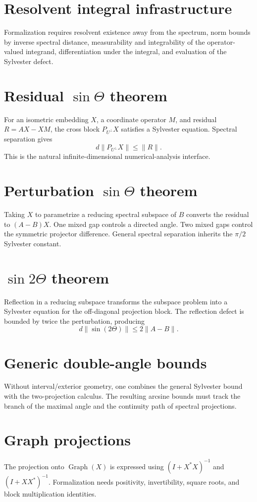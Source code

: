 \documentclass{article}
\newcommand{\Graph}{\operatorname{Graph}}
\begin{document}
\section{Resolvent integral infrastructure}
Formalization requires resolvent existence away from the spectrum, norm
bounds by inverse spectral distance, measurability and integrability of the
operator-valued integrand, differentiation under the integral, and evaluation
of the Sylvester defect.

\section{Residual $\sin\Theta$ theorem}
For an isometric embedding $X$, a coordinate operator $M$, and residual
$R=AX-XM$, the cross block $P_{U^\perp}X$ satisfies a Sylvester equation.
Spectral separation gives
\[
 d\|P_{U^\perp}X\|\le\|R\|.
\]
This is the natural infinite-dimensional numerical-analysis interface.

\section{Perturbation $\sin\Theta$ theorem}
Taking $X$ to parametrize a reducing spectral subspace of $B$ converts the
residual to $(A-B)X$.  One mixed gap controls a directed angle.  Two mixed gaps
control the symmetric projector difference.  General spectral separation
inherits the $\pi/2$ Sylvester constant.

\section{$\sin 2\Theta$ theorem}
Reflection in a reducing subspace transforms the subspace problem into a
Sylvester equation for the off-diagonal projection block.  The reflection
defect is bounded by twice the perturbation, producing
\[
 d\|\sin(2\Theta)\|\le2\|A-B\|.
\]

\section{Generic double-angle bounds}
Without interval/exterior geometry, one combines the general Sylvester bound
with the two-projection calculus.  The resulting arcsine bounds must track the
branch of the maximal angle and the continuity path of spectral projections.

\section{Graph projections}
The projection onto $\Graph(X)$ is expressed using
$(I+X^*X)^{-1}$ and $(I+XX^*)^{-1}$.  Formalization needs positivity,
invertibility, square roots, and block multiplication identities.
\end{document}
